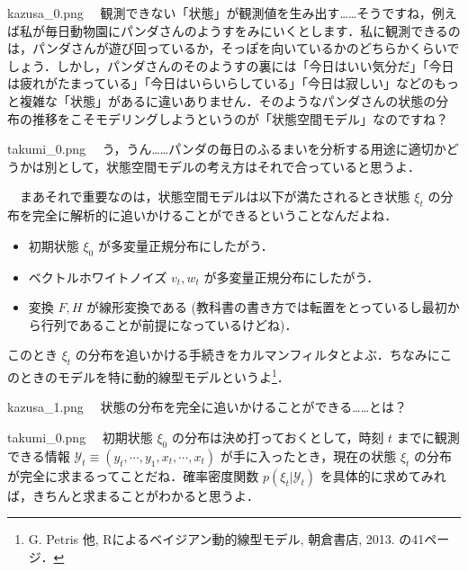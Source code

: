 \documentclass[b5paper,xelatex,ja=standard,10pt]{bxjsarticle}
\begin{document}
\begin{SERIFU}[colback=PaleIris]{kazusa_0.png}
　観測できない「状態」が観測値を生み出す……そうですね，例えば私が毎日動物園にパンダさんのようすをみにいくとします．私に観測できるのは，パンダさんが遊び回っているか，そっぽを向いているかのどちらかくらいでしょう．しかし，パンダさんのそのようすの裏には「今日はいい気分だ」「今日は疲れがたまっている」「今日はいらいらしている」「今日は寂しい」などのもっと複雑な「状態」があるに違いありません．そのようなパンダさんの状態の分布の推移をこそモデリングしようというのが「状態空間モデル」なのですね？
\end{SERIFU}


\begin{SERIFU}[colback=PaleGold]{takumi_0.png}
　う，うん……パンダの毎日のふるまいを分析する用途に適切かどうかは別として，状態空間モデルの考え方はそれで合っていると思うよ．

　まあそれで重要なのは，状態空間モデルは以下が満たされるとき状態 $\xi_t$ の分布を完全に解析的に追いかけることができるということなんだよね．
\begin{itemize}
  \item 初期状態 $\xi_0$ が多変量正規分布にしたがう．
  \item ベクトルホワイトノイズ $v_t, w_t$ が多変量正規分布にしたがう．
  \item 変換 $F, H$ が線形変換である (教科書の書き方では転置をとっているし最初から行列であることが前提になっているけどね)．
\end{itemize}
このとき $\xi_{t}$ の分布を追いかける手続きをカルマンフィルタとよぶ．ちなみにこのときのモデルを特に動的線型モデルというよ\footnote{G. Petris 他, Rによるベイジアン動的線型モデル, 朝倉書店, 2013. の41ページ．}．
\end{SERIFU}


\begin{SERIFU}[colback=PaleIris]{kazusa_1.png}
　状態の分布を完全に追いかけることができる……とは？
\end{SERIFU}


\begin{SERIFU}[colback=PaleGold]{takumi_0.png}
　初期状態 $\xi_0$ の分布は決め打っておくとして，時刻 $t$ までに観測できる情報 $\mathcal{Y}_t \equiv (y_t, \cdots, y_1, x_t, \cdots, x_t)$ が手に入ったとき，現在の状態 $\xi_t$ の分布が完全に求まるってことだね．確率密度関数 $p(\xi_t | \mathcal{Y}_t)$ を具体的に求めてみれば，きちんと求まることがわかると思うよ．
\end{SERIFU}
\end{document}
